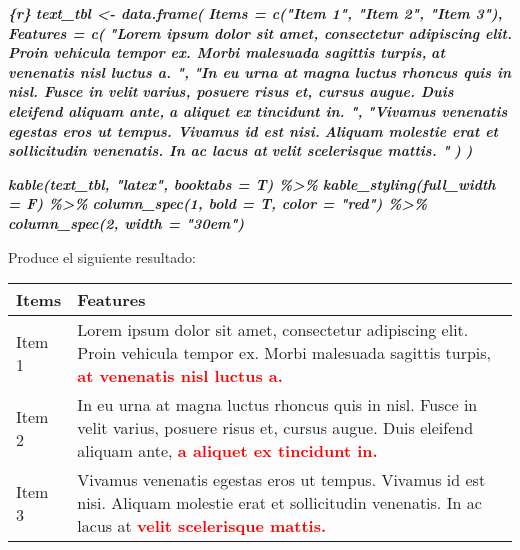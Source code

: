 \documentclass[12pt,a4paper,]{book}
\newenvironment{Shaded}{\begin{snugshade}}{\end{snugshade}}
\newcommand{\InformationTok}[1]{\textcolor[rgb]{0.56,0.35,0.01}{\textbf{\textit{#1}}}}
\numberwithin{dummy}{section}
\theoremstyle{ocrenumbox}
\theoremstyle{blacknumex}
\theoremstyle{blacknumbox}
\theoremstyle{ocrenum}
\theoremstyle{ocrenum}
\begin{document}
\begin{Shaded}
\begin{Highlighting}[]
\InformationTok{\textasciigrave{}\textasciigrave{}\textasciigrave{}\{r\}}
\InformationTok{text\_tbl \textless{}{-} data.frame(}
\InformationTok{  Items = c("Item 1", "Item 2", "Item 3"), }
\InformationTok{  Features = c(}
\InformationTok{    "Lorem ipsum dolor sit amet, consectetur adipiscing elit.}
\InformationTok{    Proin vehicula tempor ex. Morbi malesuada sagittis turpis,}
\InformationTok{    at venenatis nisl luctus a. ",}
\InformationTok{    "In eu urna at magna luctus rhoncus quis in nisl. Fusce in velit}
\InformationTok{    varius, posuere risus et, cursus augue. Duis eleifend aliquam ante,}
\InformationTok{    a aliquet ex tincidunt in. ",}
\InformationTok{    "Vivamus venenatis egestas eros ut tempus. Vivamus id est nisi.}
\InformationTok{    Aliquam molestie erat et sollicitudin venenatis. In ac lacus at}
\InformationTok{    velit scelerisque mattis. "}
\InformationTok{    ) }
\InformationTok{  )}

\InformationTok{kable(text\_tbl, "latex", booktabs = T) \%\textgreater{}\% }
\InformationTok{  kable\_styling(full\_width = F) \%\textgreater{}\% }
\InformationTok{  column\_spec(1, bold = T, color = "red") \%\textgreater{}\% }
\InformationTok{  column\_spec(2, width = "30em")}
\InformationTok{\textasciigrave{}\textasciigrave{}\textasciigrave{}}
\end{Highlighting}
\end{Shaded}

Produce el siguiente resultado:

\begin{table}[H]
 \centering
 \begin{tabular}{>{}l>{\raggedright\arraybackslash}p{30em}}
 \toprule
 Items & Features\\
 \midrule
 Item 1 & Lorem ipsum dolor sit amet, consectetur adipiscing elit.
     Proin vehicula tempor ex. Morbi malesuada sagittis turpis,
 \textcolor{red}{\textbf{    at venenatis nisl luctus a.}}\\
 Item 2 & In eu urna at magna luctus rhoncus quis in nisl. Fusce in velit
     varius, posuere risus et, cursus augue. Duis eleifend aliquam ante,
 \textcolor{red}{\textbf{    a aliquet ex tincidunt in.}}\\
 Item 3 & Vivamus venenatis egestas eros ut tempus. Vivamus id est nisi.
     Aliquam molestie erat et sollicitudin venenatis. In ac lacus at
 \textcolor{red}{\textbf{    velit scelerisque mattis.}}\\
 \bottomrule
 \end{tabular}
 \end{table}
\end{document}
